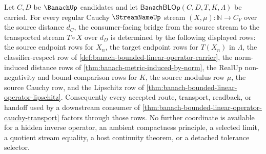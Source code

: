 \begin{lemma}
\label{lem:banach-bounded-linear-operator-cauchy-bridge-determinacy}
Let $C,D$ be $\BanachUp$ candidates and let
$\mathsf{BanachBLOp}(C,D,T,K,\Lambda)$ be carried. For every regular Cauchy
$\StreamNameUp$ stream $(X,\mu):\mathbb{N}\to C_V$ over the source distance
$d_C$, the consumer-facing bridge from the source stream to the transported
stream $T\circ X$ over $d_D$ is determined by the following displayed rows:
the source endpoint rows for $X_n$, the target endpoint rows for $T(X_n)$ in
$\Lambda$, the classifier-respect row of
\autoref{def:banach-bounded-linear-operator-carrier}, the norm-induced
distance rows of \autoref{thm:banach-metric-induced-by-norm}, the RealUp
non-negativity and bound-comparison rows for $K$, the source modulus row
$\mu$, the source Cauchy row, and the Lipschitz row of
\autoref{thm:banach-bounded-linear-operator-lipschitz}. Consequently every
accepted route, transport, readback, or handoff used by a downstream consumer
of \autoref{thm:banach-bounded-linear-operator-cauchy-transport} factors
through those rows. No further coordinate is available for a hidden inverse
operator, an ambient compactness principle, a selected limit, a quotient stream
equality, a host continuity theorem, or a detached tolerance selector.
\end{lemma}
